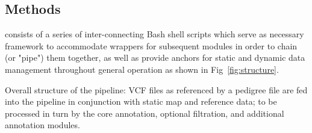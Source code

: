 \begin{methods}

\section{Methods}

\app consists of a series of inter-connecting Bash shell scripts which serve as necessary framework to accommodate wrappers for subsequent modules in order to chain (or "pipe") them together, as well as provide anchors for static and dynamic data management throughout general operation as shown in Fig~\ref{fig:structure}.

 {Overall structure of the \app pipeline: VCF files as referenced by a pedigree file are fed into the pipeline in conjunction with static map and reference data; to be processed in turn by the core annotation, optional filtration, and additional annotation modules.} 




\end{methods}